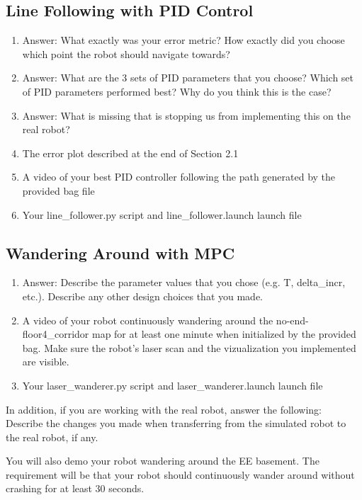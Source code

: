 \documentclass[final]{article}
\begin{document}
\subsection{Line Following with PID Control}
\begin{enumerate}
\item Answer: What exactly was your error metric? How exactly did you choose which point the robot should navigate towards?
\item Answer: What are the 3 sets of PID parameters that you choose? Which set of PID parameters performed best? Why do you think this is the case?
\item Answer: What is missing that is stopping us from implementing this on the real robot?
\item The error plot described at the end of Section 2.1
\item A video of your best PID controller following the path generated by the provided bag file
\item Your line\_follower.py script and line\_follower.launch launch file
\end{enumerate}

\subsection{Wandering Around with MPC}
\begin{enumerate}
\item Answer: Describe the parameter values that you chose (e.g. T, delta\_incr, etc.). Describe any other design choices that you made.
\item A video of your robot continuously wandering around the no-end-floor4\_corridor map for at least one minute when initialized by the provided bag. Make sure the robot's laser scan and the vizualization you implemented are visible.
\item Your laser\_wanderer.py script and laser\_wanderer.launch launch file
\end{enumerate}

In addition, if you are working with the real robot, answer the following: \\
Describe the changes you made when transferring from the simulated robot to the real robot, if any.

You will also demo your robot wandering around the EE basement. The requirement will be that your robot should continuously wander around without crashing for at least 30 seconds. 
\end{document}
